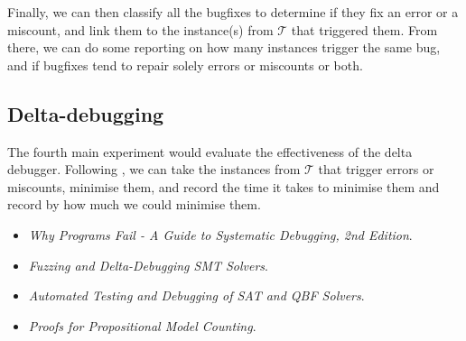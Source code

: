 \documentclass[a4paper]{tufte-handout}
\begin{document}
\begin{experiments}
		Finally, we can then classify all the bugfixes to determine if they fix an error or a miscount, and link them to the instance(s) from $\mathcal{T}$ that triggered them.
		From there, we can do some reporting on how many instances trigger the same bug, and if bugfixes tend to repair solely errors or miscounts or both.
		
		\subsection*{Delta-debugging}
		
		The fourth main experiment would evaluate the effectiveness of the delta debugger.
		Following \citep{BLB10}, we can take the instances from $\mathcal{T}$ that trigger errors or miscounts, minimise them, and record the time it takes to minimise them and record by how much we could minimise them.
		
	\end{experiments}

	
	\begin{literature}
		\begin{itemize}
			\item \citep{Zel09} \textit{Why Programs Fail - {A} Guide to Systematic Debugging, 2nd Edition}.
			\item \citep{BB09} \textit{Fuzzing and Delta-Debugging SMT Solvers}.
			\item \citep{BLB10} \textit{Automated Testing and Debugging of SAT and QBF Solvers}.
			\item \citep{FHR22} \textit{Proofs for Propositional Model Counting}.
		\end{itemize}
	\end{literature}
	
	
\end{document}
